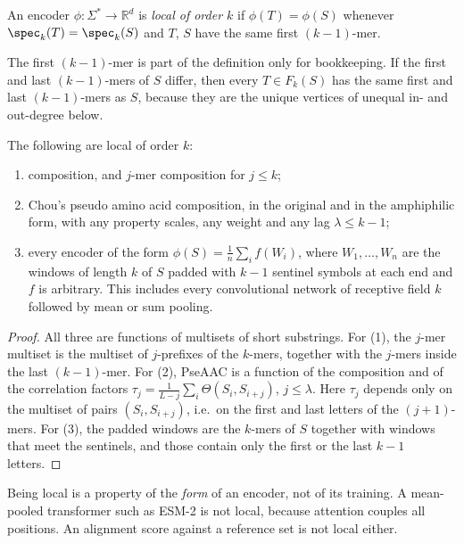 \begin{definition}\label{ch12:def:local}
An encoder $\phi\colon\Sigma^{*}\to\mathbb R^{d}$ is \emph{local of order $k$} if $\phi(T)=\phi(S)$
whenever $\spec_k(T)=\spec_k(S)$ and $T$, $S$ have the same first $(k-1)$-mer.
\end{definition}

The first $(k-1)$-mer is part of the definition only for bookkeeping. If the first and last
$(k-1)$-mers of $S$ differ, then every $T\in F_k(S)$ has the same first and last $(k-1)$-mers as $S$,
because they are the unique vertices of unequal in- and out-degree below.

\begin{proposition}\label{ch12:prop:local}
The following are local of order $k$:
\begin{enumerate}
\item composition, and $j$-mer composition for $j\le k$;
\item Chou's pseudo amino acid composition, in the original and in the amphiphilic form, with any
property scales, any weight and any lag $\lambda\le k-1$;
\item every encoder of the form $\phi(S)=\frac1n\sum_{i}f(W_i)$, where $W_1,\dots,W_n$ are the windows
of length $k$ of $S$ padded with $k-1$ sentinel symbols at each end and $f$ is arbitrary. This includes
every convolutional network of receptive field $k$ followed by mean or sum pooling.
\end{enumerate}
\end{proposition}

\begin{proof}
All three are functions of multisets of short substrings. For (1), the $j$-mer multiset is the multiset
of $j$-prefixes of the $k$-mers, together with the $j$-mers inside the last $(k-1)$-mer. For (2),
PseAAC is a function of the composition and of the correlation factors
$\tau_j=\frac1{L-j}\sum_i\Theta(S_i,S_{i+j})$, $j\le\lambda$. Here $\tau_j$ depends only on the
multiset of pairs $(S_i,S_{i+j})$, i.e.\ on the first and last letters of the $(j+1)$-mers. For (3), the
padded windows are the $k$-mers of $S$ together with windows that meet the sentinels, and those contain
only the first or the last $k-1$ letters.
\end{proof}

Being local is a property of the \emph{form} of an encoder, not of its training. A mean-pooled
transformer such as ESM-2 is not local, because attention couples all positions. An alignment
score against a reference set is not local either.

